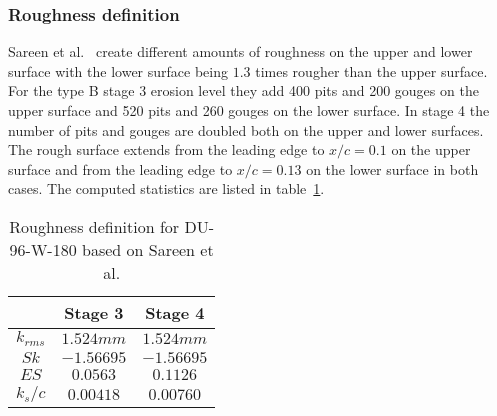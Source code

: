 \subsubsection{Roughness definition}
Sareen et al.~\cite{sareen2014effects} create different amounts of roughness on the upper and lower surface with the lower surface being $1.3$ times rougher than the upper surface. For the type B stage 3 erosion level they add 400 pits and 200 gouges on the upper surface and 520 pits and 260 gouges on the lower surface. In stage 4 the number of pits and gouges are doubled both on the upper and lower surfaces. The rough surface extends from the leading edge to $x/c=0.1$ on the upper surface and from the leading edge to $x/c=0.13$ on the lower surface in both cases. The computed statistics are listed in table~\ref{tab:rghdef}. 
\begin{table}[h!]
\centering
\captionsetup{justification=centering}
\begin{tabular}{ |c|c|c| } 
\hline
 & Stage 3 & Stage 4 \\
 \hline
 $k_{rms}$ & $1.524mm$& $1.524mm$ \\ 
 $Sk$ & $-1.56695$ &$-1.56695$ \\ 
 $ES$ & $0.0563$ & $0.1126$ \\ 
 $k_s/c$ & $0.00418$ & $0.00760$ \\ 
 \hline
\end{tabular}
\caption{Roughness definition for DU-96-W-180 based on Sareen et al\cite{sareen2014effects}.}
\label{tab:rghdef}
\end{table}

